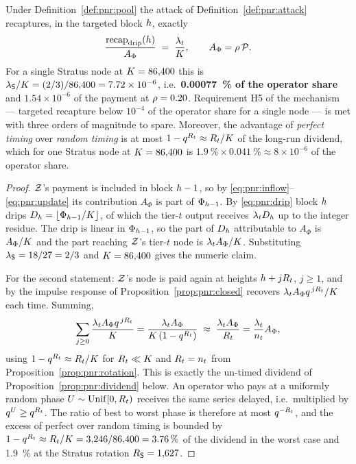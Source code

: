 \begin{theorem}
\label{thm:pnr:timing}
Under Definition~\ref{def:pnr:pool} the attack of Definition~\ref{def:pnr:attack} recaptures, in the
targeted block $h$, exactly
\[
  \frac{\mathrm{recap}_{\mathrm{drip}}(h)}{A_\Phi} \;=\; \frac{\lambda_{t}}{K},
  \qquad A_\Phi = \rho\,\mathcal{P} .
\]
For a single Stratus node at $K = 86{,}400$ this is
$\lambda_{\mathsf{S}}/K = (2/3)/86{,}400 = 7.72 \times 10^{-6}$, i.e.\
\textbf{\SI{0.00077}{\percent} of the operator share} and $1.54\times10^{-6}$ of the payment at
$\rho = 0.20$. Requirement H5 of the mechanism --- targeted recapture below $10^{-4}$ of the
operator share for a single node --- is met with three orders of magnitude to spare. Moreover, the
advantage of \emph{perfect timing} over \emph{random timing} is at most
$1 - q^{R_{t}} \approx R_{t}/K$ of the long-run dividend, which for one Stratus node at
$K = 86{,}400$ is $\SI{1.9}{\percent} \times \SI{0.041}{\percent} \approx 8\times10^{-6}$ of the
operator share.
\end{theorem}

\begin{proof}
$\mathcal{Z}$'s payment is included in block $h-1$, so by \eqref{eq:pnr:inflow}--\eqref{eq:pnr:update}
its contribution $A_\Phi$ is part of $\Phi_{h-1}$. By \eqref{eq:pnr:drip} block $h$ drips
$D_{h} = \lfloor\Phi_{h-1}/K\rfloor$, of which the tier-$t$ output receives
$\lambda_{t}D_{h}$ up to the integer residue. The drip is linear in $\Phi_{h-1}$, so the part
of $D_{h}$ attributable to $A_\Phi$ is $A_\Phi/K$ and the part reaching $\mathcal{Z}$'s tier-$t$ node
is $\lambda_{t}A_\Phi/K$. Substituting $\lambda_{\mathsf{S}} = 18/27 = 2/3$ and $K = 86{,}400$
gives the numeric claim.

For the second statement: $\mathcal{Z}$'s node is paid again at heights $h + jR_{t}$, $j \ge 1$, and by
the impulse response of Proposition~\ref{prop:pnr:closed} recovers
$\lambda_{t}A_\Phi q^{\,jR_{t}}/K$ each time. Summing,
\[
  \sum_{j \ge 0}\frac{\lambda_{t}A_\Phi q^{\,jR_{t}}}{K}
  = \frac{\lambda_{t}A_\Phi}{K\,(1 - q^{R_{t}})}
  \;\approx\; \frac{\lambda_{t}A_\Phi}{R_{t}}
  = \frac{\lambda_{t}}{n_{t}}A_\Phi ,
\]
using $1 - q^{R_{t}} \approx R_{t}/K$ for $R_{t} \ll K$ and
$R_{t} = n_{t}$ from Proposition~\ref{prop:pnr:rotation}. This is exactly the un-timed
dividend of Proposition~\ref{prop:pnr:dividend} below. An operator who pays at a uniformly random
phase $U \sim \mathrm{Unif}[0, R_{t})$ receives the same series delayed, i.e.\ multiplied by
$q^{U} \ge q^{R_{t}}$. The ratio of best to worst phase is therefore at most
$q^{-R_{t}}$, and the excess of perfect over random timing is bounded by
$1 - q^{R_{t}} \approx R_{t}/K = 3{,}246/86{,}400 = \SI{3.76}{\percent}$ of the dividend in
the worst case and \SI{1.9}{\percent} at the Stratus rotation $R_{\mathsf{S}} = 1{,}627$.
\end{proof}

